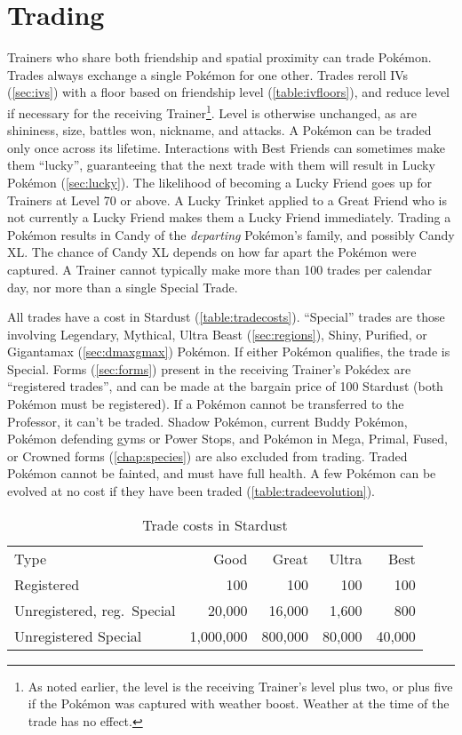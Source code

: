 \section{Trading\label{sec:trades}}
Trainers who share both friendship and spatial proximity can trade Pokémon.
Trades always exchange a single Pokémon for one other.
Trades reroll IVs (\autoref{sec:ivs}) with a floor based on friendship level (\autoref{table:ivfloors}),
  and reduce level if necessary for the receiving Trainer\footnote{As noted earlier, the level is
  the receiving Trainer's level plus two, or plus five if the Pokémon was captured with weather boost.
  Weather at the time of the trade has no effect.}.
Level is otherwise unchanged, as are shininess, size, battles won, nickname, and attacks.
A Pokémon can be traded only once across its lifetime.
Interactions with Best Friends can sometimes make them ``lucky'', guaranteeing that the next trade with
  them will result in Lucky Pokémon (\autoref{sec:lucky}).
The likelihood of becoming a Lucky Friend goes up for Trainers at Level 70 or above.
A Lucky Trinket applied to a Great Friend who is not currently a Lucky Friend makes them
 a Lucky Friend immediately.
Trading a Pokémon results in Candy of the \textit{departing} Pokémon's family,
  and possibly Candy XL\@.
The chance of Candy XL depends on how far apart the Pokémon were captured.
A Trainer cannot typically make more than 100 trades per calendar day, nor more
 than a single Special Trade.

All trades have a cost in Stardust (\autoref{table:tradecosts}).
``Special'' trades are those involving Legendary, Mythical, Ultra Beast (\autoref{sec:regions}),
  Shiny, Purified, or Gigantamax (\autoref{sec:dmaxgmax}) Pokémon.
If either Pokémon qualifies, the trade is Special.
Forms (\autoref{sec:forms}) present in the receiving Trainer's Pokédex are
  ``registered trades'', and can be made at the bargain price of 100 Stardust
  (both Pokémon must be registered).
If a Pokémon cannot be transferred to the Professor, it can't be traded.
Shadow Pokémon, current Buddy Pokémon, Pokémon defending gyms or Power Stops, and Pokémon
 in Mega, Primal, Fused, or Crowned forms (\autoref{chap:species}) are also excluded from trading.
Traded Pokémon cannot be fainted, and must have full health.
A few Pokémon can be evolved at no cost if they have been traded (\autoref{table:tradeevolution}).
\begin{table}
\centering
\begin{tabular}{lrrrr}
Type & Good & Great & Ultra & Best\\
\Midrule
Registered & 100 & 100 & 100 & 100\\
Unregistered, reg.\ Special & 20,000 & 16,000 & 1,600 & 800\\
Unregistered Special & 1,000,000 & 800,000 & 80,000 & 40,000\\
\end{tabular}
\caption{Trade costs in Stardust\label{table:tradecosts}}
\end{table}

